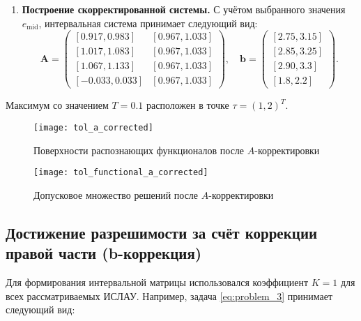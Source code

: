 \documentclass{article}
\begin{document}
\begin{enumerate}
      \item \textbf{Построение скорректированной системы.} С учётом выбранного значения \( e_{\text{mid}} \), интервальная система принимает следующий вид:
      \[
      \mathbf{A} = \begin{pmatrix}
          [0.917, 0.983] & [0.967, 1.033] \\
          [1.017, 1.083] & [0.967, 1.033] \\
          [1.067, 1.133] & [0.967, 1.033] \\
          [-0.033, 0.033] & [0.967, 1.033]
      \end{pmatrix}, \quad
      \mathbf{b} = \begin{pmatrix}
          [2.75, 3.15] \\
          [2.85, 3.25] \\
          [2.90, 3.3] \\
          [1.8, 2.2]
      \end{pmatrix}.
      \]
    \end{enumerate}

  Максимум со значением \( T = 0.1 \) расположен в точке
  \( \tau = (1, 2)^T \).

  \begin{figure}[H]
		\begin{center}
			\texttt{[image: tol\_a\_corrected]}
			\caption{Поверхности распознающих функционалов после
        \( A \)-корректировки}
      \label{figure:tol_a_corrected}
		\end{center}
	\end{figure}

  \begin{figure}[H]
		\begin{center}
			\texttt{[image: tol\_functional\_a\_corrected]}
			\caption{Допусковое множество решений после \( A \)-корректировки}
      \label{figure:tol_functional_a_corrected}
		\end{center}
	\end{figure}

\subsection{Достижение разрешимости за счёт коррекции правой части (b-коррекция)}

Для формирования интервальной матрицы использовался коэффициент \( K = 1 \) для всех рассматриваемых ИСЛАУ. Например, задача \ref{eq:problem_3} принимает следующий вид:
\end{document}
